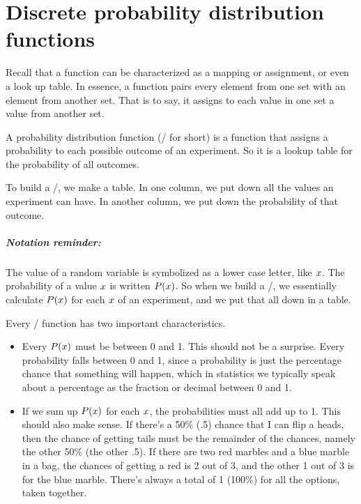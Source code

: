 \documentclass[../../../main.tex]{subfiles}
\begin{document}
\chapter{Discrete probability distribution functions}


Recall that a function can be characterized as a mapping or assignment, or even a look up table. In essence, a function pairs every element from one set with an element from another set. That is to say, it assigns to each value in one set a value from another set.

A probability distribution function (\PDFtext/ for short) is a function that assigns a probability to each possible outcome of an experiment. So it is a lookup table for the probability of all outcomes.

To build a \PDFtext/, we make a table. In one column, we put down all the values an experiment can have. In another column, we put down the probability of that outcome. 

\paragraph{Notation reminder:}

The value of a random variable is symbolized as a lower case letter, like $\RandVarVal/$. The probability of a value $\RandVarVal/$ is written $\Probability{\RandVarVal/}$. So when we build a \PDFtext/, we essentially calculate $\Probability{\RandVarVal/}$ for each $\RandVarVal/$ of an experiment, and we put that all down in a table.

Every \PDFtext/ function has two important characteristics.

\begin{itemize}

  \item Every $\Probability{\RandVarVal/}$ must be between 0 and 1. This should not be a surprise. Every probability falls between 0 and 1, since a probability is just the percentage chance that something will happen, which in statistics we typically speak about a percentage as the fraction or decimal between 0 and 1.

  \item If we sum up $\Probability{\RandVarVal/}$ for each $\RandVarVal/$, the probabilities must all add up to 1. This should also make sense. If there's a 50\% (.5) chance that I can flip a heads, then the chance of getting tails must be the remainder of the chances, namely the other 50\% (the other .5). If there are two red marbles and a blue marble in a bag, the chances of getting a red is 2 out of 3, and the other 1 out of 3 is for the blue marble. There's always a total of 1 (100\%) for all the options, taken together.

\end{itemize}
\end{document}
